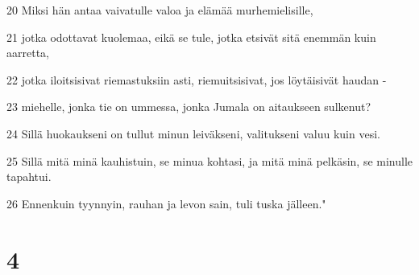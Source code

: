 \par 20 Miksi hän antaa vaivatulle valoa ja elämää murhemielisille,
\par 21 jotka odottavat kuolemaa, eikä se tule, jotka etsivät sitä enemmän kuin aarretta,
\par 22 jotka iloitsisivat riemastuksiin asti, riemuitsisivat, jos löytäisivät haudan -
\par 23 miehelle, jonka tie on ummessa, jonka Jumala on aitaukseen sulkenut?
\par 24 Sillä huokaukseni on tullut minun leiväkseni, valitukseni valuu kuin vesi.
\par 25 Sillä mitä minä kauhistuin, se minua kohtasi, ja mitä minä pelkäsin, se minulle tapahtui.
\par 26 Ennenkuin tyynnyin, rauhan ja levon sain, tuli tuska jälleen."

\chapter{4}

